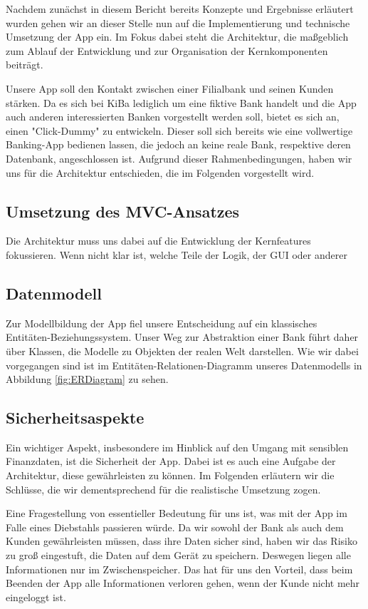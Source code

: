 	Nachdem zunächst in diesem Bericht bereits Konzepte und Ergebnisse erläutert wurden gehen wir an dieser Stelle nun auf die Implementierung und technische Umsetzung der App ein. Im Fokus dabei steht die Architektur, die maßgeblich zum Ablauf der Entwicklung und zur Organisation der Kernkomponenten beiträgt.
	
	Unsere App soll den Kontakt zwischen einer Filialbank und seinen Kunden stärken. Da es sich bei KiBa lediglich um eine fiktive Bank handelt und die App auch anderen interessierten Banken vorgestellt werden soll, bietet es sich an, einen "Click-Dummy" zu entwickeln. Dieser soll sich bereits wie eine vollwertige Banking-App bedienen lassen, die jedoch an keine reale Bank, respektive deren Datenbank, angeschlossen ist. Aufgrund dieser Rahmenbedingungen, haben wir uns für die Architektur entschieden, die im Folgenden vorgestellt wird.

\subsection{Umsetzung des MVC-Ansatzes}
	Die Architektur muss uns dabei auf die Entwicklung der Kernfeatures fokussieren. Wenn nicht klar ist, welche Teile der Logik, der GUI oder anderer 

\subsection{Datenmodell}	
	Zur Modellbildung der App fiel unsere Entscheidung auf ein klassisches Entitäten-Be\-zieh\-ungs\-sys\-tem. Unser Weg zur Abstraktion einer Bank führt daher 
	über Klassen, die Modelle zu Objekten der realen Welt darstellen. Wie wir dabei vorgegangen sind ist im Entitäten-Relationen-Diagramm unseres Datenmodells in Abbildung \ref{fig:ERDiagram} zu sehen.
	
	

\subsection{Sicherheitsaspekte}
	Ein wichtiger Aspekt, insbesondere im Hinblick auf den Umgang mit sensiblen Finanzdaten, ist die Sicherheit der App. Dabei ist es auch eine Aufgabe der Architektur, diese gewährleisten zu können. Im Folgenden erläutern wir die Schlüsse, die wir dementsprechend für die realistische Umsetzung zogen.
	
	Eine Fragestellung von essentieller Bedeutung für uns ist, was mit der App im Falle eines Diebstahls passieren würde. Da wir sowohl der Bank als auch dem Kunden gewährleisten müssen, dass ihre Daten sicher sind, haben wir das Risiko zu groß eingestuft, die Daten auf dem Gerät zu speichern. Deswegen liegen alle Informationen nur im Zwischenspeicher. Das hat für uns den Vorteil, dass beim Beenden der App alle Informationen verloren gehen, wenn der Kunde nicht mehr eingeloggt ist.
	
